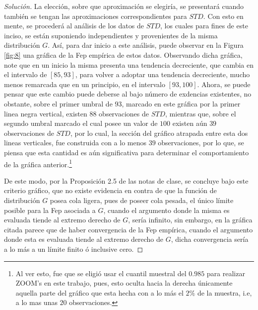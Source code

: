 \documentclass[10.5pt,notitlepage]{article}
\newenvironment{solucion}
  {\begin{proof}[Solución]}
  {\end{proof}}
\theoremstyle{plain}
\begin{document}
\begin{solucion}
La elección, sobre que aproximación se elegiría, se presentará cuando también se tengan las aproximaciones correspondientes para \(STD\). Con esto en mente, se procederá al análisis de los datos de \(STD\), los cuales para fines de este inciso, se están suponiendo independientes y provenientes de la misma distribución \(G\). Así, para dar inicio a este análisis, puede observar en la Figura \ref{fig:8} una gráfica de la Fep empírica de estos datos. Observando dicha gráfica, note que en un inicio la misma presenta una tendencia decreciente, que cambia en el intervalo de \([85,93]\), para volver a adoptar una tendencia decreciente, mucho menos remarcada que en un principio, en el intervalo \([93,100]\). Ahora, se puede pensar que este cambio puede deberse al bajo número de exdencias existentes, no obstante, sobre el primer umbral de \(93\), marcado en este gráfica por la primer linea negra vertical, existen \(88\) observaciones de \(STD\), mientras que, sobre el segundo umbral marcado el cual posee un valor de \(100\) existen aún \(39\) observaciones de \(STD\), por lo cual, la sección del gráfico atrapada entre esta dos lineas verticales, fue construida con a lo menos \(39\) observaciones, por lo que, se piensa que esta cantidad es aún significativa para determinar el comportamiento de la gráfica anterior.\footnote{Al ver esto, fue que se eligió usar el cuantil muestral del \(0.985\) para realizar ZOOM's en este trabajo, pues, esto oculta hacia la derecha únicamente aquella parte del gráfico que esta hecha con a lo más el \(2\%\) de la muestra, i.e, a lo mas unas \(20\) observaciones.} 

De este modo, por la Proposición 2.5 de las notas de clase, se concluye bajo este criterio gráfico, que no existe evidencia en contra de que la función de distribución \(G\) posea cola ligera, pues de poseer cola pesada, el único límite posible para la Fep asociada a \(G\), cuando el argumento donde la misma es evaluada tiende al extremo derecho de \(G\), sería infinito, sin embargo, en la gráfica citada parece que de haber convergencia de la Fep empírica, cuando el argumento donde esta es evaluada tiende al extremo derecho de \(G\), dicha convergencia sería a lo más a un límite finito ó inclusive cero.


\end{solucion}
\end{document}

